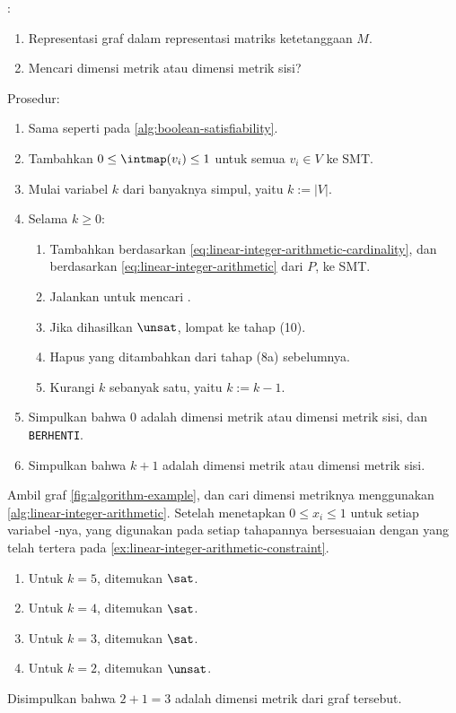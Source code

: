 \begin{algorithm}
	:
	\begin{enumerate}
		\item Representasi graf dalam representasi matriks ketetanggaan \(M\).
		\item Mencari dimensi metrik atau dimensi metrik sisi?
	\end{enumerate}
	Prosedur:
	\begin{enumerate}
		\item[1--5.] Sama seperti pada \autoref{alg:boolean-satisfiability}.
		\setcounter{enumi}{5}
		\item Tambahkan  \(0 \leq \intmap(v_i) \leq 1\) untuk semua \(v_i \in V\) ke  SMT.
		\item Mulai variabel \(k\) dari banyaknya simpul, yaitu \(k := |V|\).
		\item Selama \(k \geq 0\):
			\begin{enumerate}
					\item Tambahkan  berdasarkan \autoref{eq:linear-integer-arithmetic-cardinality}, dan berdasarkan \autoref{eq:linear-integer-arithmetic} dari \(P\), ke  SMT.
					\item Jalankan  untuk mencari .
					\item Jika dihasilkan \(\unsat\), lompat ke tahap (10).
					\item Hapus  yang ditambahkan dari tahap (8a) sebelumnya.
					\item Kurangi \(k\) sebanyak satu, yaitu \(k := k - 1\).
			\end{enumerate}
		\item Simpulkan bahwa 0 adalah dimensi metrik atau dimensi metrik sisi, dan \texttt{BERHENTI}.
		\item Simpulkan bahwa \(k + 1\) adalah dimensi metrik atau dimensi metrik sisi.
	\end{enumerate}
	\caption{}
	\label{alg:linear-integer-arithmetic}
\end{algorithm}

\begin{example}
	Ambil graf \autoref{fig:algorithm-example}, dan cari dimensi metriknya menggunakan \autoref{alg:linear-integer-arithmetic}. Setelah menetapkan  \(0 \leq x_i \leq 1\) untuk setiap variabel -nya,  yang digunakan pada setiap tahapannya bersesuaian dengan yang telah tertera pada \autoref{ex:linear-integer-arithmetic-constraint}.
	\begin{enumerate}
		\item Untuk \(k = 5\), ditemukan \(\sat\).
		\item Untuk \(k = 4\), ditemukan \(\sat\).
		\item Untuk \(k = 3\), ditemukan \(\sat\).
		\item Untuk \(k = 2\), ditemukan \(\unsat\).
	\end{enumerate}
	Disimpulkan bahwa \(2 + 1 = 3\) adalah dimensi metrik dari graf tersebut.
\end{example}
